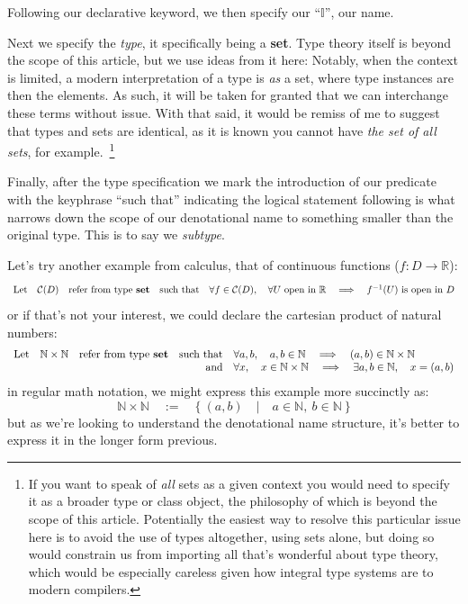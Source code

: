 \documentclass[twoside]{article}
\newcommand{\then}{\ensuremath{\quad\Longrightarrow\quad}}
\begin{document}
Following our declarative keyword, we then specify our ``$ \mathbb{I} $'', our name.

Next we specify the \emph{type}, it specifically being a {\bf set}. Type theory itself is beyond the scope of this
article, but we use ideas from it here: Notably, when the context is limited, a modern interpretation of a type is
\emph{as} a set, where type instances are then the elements. As such, it will be taken for granted that we can
interchange these terms without issue. With that said, it would be remiss of me to suggest that types and sets
are identical, as it is known you cannot have \emph{the set of all sets}, for example.~\footnote{If you want to speak of
\emph{all} sets as a given context you would need to specify it as a broader type or class object, the philosophy of which
is beyond the scope of this article. Potentially the easiest way to resolve this particular issue here is to avoid the use
of types altogether, using sets alone, but doing so would constrain us from importing all that's wonderful about type theory,
which would be especially careless given how integral type systems are to modern compilers.}

Finally, after the type specification we mark the introduction of our predicate with the keyphrase ``such that''
indicating the logical statement following is what narrows down the scope of our denotational name to something
smaller than the original type. This is to say we \emph{subtype}.

Let's try another example from calculus, that of continuous functions ($ f:D\to\mathbb{R} $):
$$ \begin{array}{rrrrl}
\mbox{Let} & \mathcal{C}(D) & \mbox{refer from type {\bf set}} & \mbox{such that}
	& \forall f\in\mathcal{C}(D),\quad\forall U\mbox{ open in }\mathbb{R}\then f^{-1}(U)\mbox{ is open in } D
\end{array} $$
or if that's not your interest, we could declare the cartesian product of natural numbers:
$$ \begin{array}{rrrrl}
\mbox{Let} & \mathbb{N}\times\mathbb{N} & \mbox{refer from type {\bf set}} & \mbox{such that}
	& \forall a,b,\quad a,b\in\mathbb{N}\then (a,b)\in\mathbb{N}\times\mathbb{N}			\\
	& & & \mbox{and} & \forall x,\quad x\in\mathbb{N}\times\mathbb{N}\then\exists a,b\in\mathbb{N},\quad x=(a,b)
\end{array} $$
in regular math notation, we might express this example more succinctly as:
$$ \mathbb{N}\times\mathbb{N}\quad:=\quad\{\ (a,b)\quad|\quad a\in\mathbb{N},\ b\in\mathbb{N}\ \} $$
but as we're looking to understand the denotational name structure, it's better to express it in the longer form previous.
\end{document}
